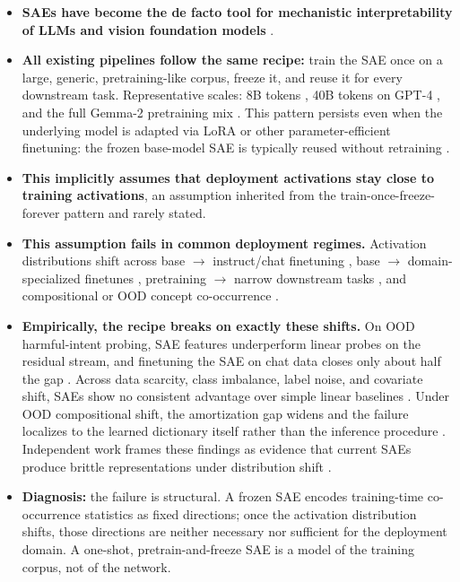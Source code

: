 \begin{itemize}
    \item \textbf{SAEs have become the de facto tool for mechanistic interpretability of LLMs and vision foundation models} \cite{bricken2023monosemanticity, cunningham2024sparse, templeton2024scaling, gao2024scaling, lieberum2024gemma}.

    \item \textbf{All existing pipelines follow the same recipe:} train the SAE once on a large, generic, pretraining-like corpus, freeze it, and reuse it for every downstream task. Representative scales: 8B tokens \cite{bricken2023monosemanticity}, 40B tokens on GPT-4 \cite{gao2024scaling}, and the full Gemma-2 pretraining mix \cite{lieberum2024gemma}. This pattern persists even when the underlying model is adapted via LoRA or other parameter-efficient finetuning: the frozen base-model SAE is typically reused without retraining \cite{kissane2024saes, kharlapenko2024transfer}.

    \item \textbf{This implicitly assumes that deployment activations stay close to training activations}, an assumption inherited from the train-once-freeze-forever pattern and rarely stated.

    \item \textbf{This assumption fails in common deployment regimes.} Activation distributions shift across base $\rightarrow$ instruct/chat finetuning \cite{kissane2024saes, li2025fast}, base $\rightarrow$ domain-specialized finetunes \cite{kharlapenko2024transfer}, pretraining $\rightarrow$ narrow downstream tasks \cite{smith2025negative}, and compositional or OOD concept co-occurrence \cite{menon2026stopprobing}.

    \item \textbf{Empirically, the recipe breaks on exactly these shifts.} On OOD harmful-intent probing, SAE features underperform linear probes on the residual stream, and finetuning the SAE on chat data closes only about half the gap \cite{smith2025negative}. Across data scarcity, class imbalance, label noise, and covariate shift, SAEs show no consistent advantage over simple linear baselines \cite{kantamneni2025sparse}. Under OOD compositional shift, the amortization gap widens and the failure localizes to the learned dictionary itself rather than the inference procedure \cite{menon2026stopprobing}. Independent work frames these findings as evidence that current SAEs produce brittle representations under distribution shift \cite{narayanaswamy2026masked}.

    \item \textbf{Diagnosis:} the failure is structural. A frozen SAE encodes training-time co-occurrence statistics as fixed directions; once the activation distribution shifts, those directions are neither necessary nor sufficient for the deployment domain. A one-shot, pretrain-and-freeze SAE is a model of the training corpus, not of the network.
\end{itemize}

